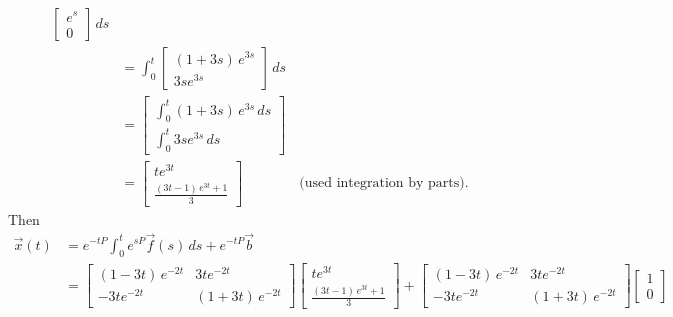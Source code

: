 \documentclass{ximera}
\begin{document}
\begin{exampleSol}
\begin{equation*}
\begin{split}
\begin{bmatrix}
                e^{s} \\ 
                0 
            \end{bmatrix} \, ds \\
            & = \int_0^t
            \begin{bmatrix}
                (1+3s)\,e^{3s} \\
                3se^{3s}
            \end{bmatrix}
            \, ds \\
            &=
            \begin{bmatrix}
                \int_0^t (1+3s)\,e^{3s} \,ds \\
                \int_0^t 3se^{3s} \,ds
            \end{bmatrix}
            \\
            & =
            \begin{bmatrix}
                t e^{3t} \\
                \frac{(3t-1) \,e^{3t} + 1}{3}
            \end{bmatrix} %
            \qquad \qquad \text{(used integration by parts).}
        \end{split}
    \end{equation*}
    Then
    \begin{equation*}
        \begin{split}
            \vec{x}(t)
            & = e^{-tP} \int_0^t e^{sP}\vec{f}(s) \, ds + e^{-tP} \vec{b} \\
            & =
            \begin{bmatrix}
                (1-3t)\,e^{-2t} & 3te^{-2t} \\
                -3te^{-2t} & (1+3t)\,e^{-2t}
            \end{bmatrix}
            \begin{bmatrix}
                t e^{3t} \\
                \frac{(3t-1) \,e^{3t} + 1}{3}
            \end{bmatrix}
            +
            \begin{bmatrix}
                (1-3t)\,e^{-2t} & 3te^{-2t} \\
                -3te^{-2t} & (1+3t)\,e^{-2t}
            \end{bmatrix}
            \begin{bmatrix} 
                1 \\ 
                0 
            \end{bmatrix} \\

\end{split}
\end{equation*}
\end{exampleSol}
\end{document}
